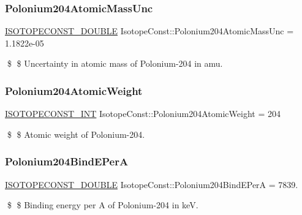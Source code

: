 \subsubsection{\texorpdfstring{Polonium204\+Atomic\+Mass\+Unc}{Polonium204AtomicMassUnc}}
{\footnotesize\ttfamily \mbox{\hyperlink{group___isotope_const-_macros_ga8f45a7272ce02c0b4c65c44636ed719a}{I\+S\+O\+T\+O\+P\+E\+C\+O\+N\+S\+T\+\_\+\+D\+O\+U\+B\+LE}} Isotope\+Const\+::\+Polonium204\+Atomic\+Mass\+Unc = 1.\+1822e-\/05}

\$ \$ Uncertainty in atomic mass of Polonium-\/204 in amu. \mbox{\label{group___isotope_const-_polonium-_po204_gaa1d5c35ea830d776ca6df4ce03b7891a}} 
\subsubsection{\texorpdfstring{Polonium204\+Atomic\+Weight}{Polonium204AtomicWeight}}
{\footnotesize\ttfamily \mbox{\hyperlink{group___isotope_const-_macros_ga5f18360b3e99483a35c32d789e62621c}{I\+S\+O\+T\+O\+P\+E\+C\+O\+N\+S\+T\+\_\+\+I\+NT}} Isotope\+Const\+::\+Polonium204\+Atomic\+Weight = 204}

\$ \$ Atomic weight of Polonium-\/204. \mbox{\label{group___isotope_const-_polonium-_po204_ga8c2d0d0dafac93354d090166be103663}} 
\subsubsection{\texorpdfstring{Polonium204\+Bind\+E\+PerA}{Polonium204BindEPerA}}
{\footnotesize\ttfamily \mbox{\hyperlink{group___isotope_const-_macros_ga8f45a7272ce02c0b4c65c44636ed719a}{I\+S\+O\+T\+O\+P\+E\+C\+O\+N\+S\+T\+\_\+\+D\+O\+U\+B\+LE}} Isotope\+Const\+::\+Polonium204\+Bind\+E\+PerA = 7839.}

\$ \$ Binding energy per A of Polonium-\/204 in keV. \mbox{\label{group___isotope_const-_polonium-_po204_ga7e6c935514016b9e3f1daba272ffd6e4}} 
